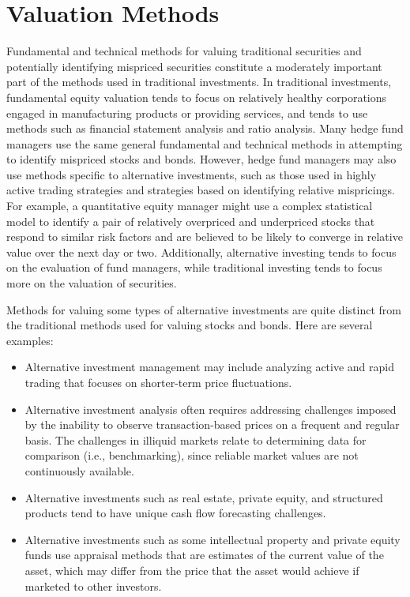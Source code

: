 \documentclass[11pt]{article}
\begin{document}
\section*{Valuation Methods}
Fundamental and technical methods for valuing traditional securities and potentially identifying mispriced securities constitute a moderately important part of the methods used in traditional investments. In traditional investments, fundamental equity valuation tends to focus on relatively healthy corporations engaged in manufacturing products or providing services, and tends to use methods such as financial statement analysis and ratio analysis. Many hedge fund managers use the same general fundamental and technical methods in attempting to identify mispriced stocks and bonds. However, hedge fund managers may also use methods specific to alternative investments, such as those used in highly active trading strategies and strategies based on identifying relative mispricings. For example, a quantitative equity manager might use a complex statistical model to identify a pair of relatively overpriced and underpriced stocks that respond to similar risk factors and are believed to be likely to converge in relative value over the next day or two. Additionally, alternative investing tends to focus on the evaluation of fund managers, while traditional investing tends to focus more on the valuation of securities.

Methods for valuing some types of alternative investments are quite distinct from the traditional methods used for valuing stocks and bonds. Here are several examples:

\begin{itemize}
  \item Alternative investment management may include analyzing active and rapid trading that focuses on shorter-term price fluctuations.
  \item Alternative investment analysis often requires addressing challenges imposed by the inability to observe transaction-based prices on a frequent and regular basis. The challenges in illiquid markets relate to determining data for comparison (i.e., benchmarking), since reliable market values are not continuously available.
  \item Alternative investments such as real estate, private equity, and structured products tend to have unique cash flow forecasting challenges.
  \item Alternative investments such as some intellectual property and private equity funds use appraisal methods that are estimates of the current value of the asset, which may differ from the price that the asset would achieve if marketed to other investors.
\end{itemize}
\end{document}
